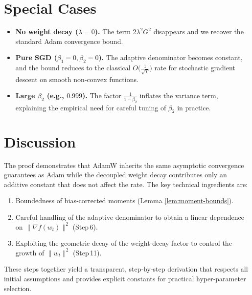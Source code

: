\documentclass{article}
\begin{document}
\section*{Special Cases}
\begin{itemize}
    \item \textbf{No weight decay ($\lambda=0$).} The term $2\lambda^{2}G^{2}$ disappears and we recover the standard Adam convergence bound.
    \item \textbf{Pure SGD ($\beta_{1}=0,\beta_{2}=0$).} The adaptive denominator becomes constant, and the bound reduces to the classical $O\!\big(\frac{1}{\sqrt{T}}\big)$ rate for stochastic gradient descent on smooth non‑convex functions.
    \item \textbf{Large $\beta_{2}$ (e.g., $0.999$).} The factor $\frac{1}{1-\beta_{2}}$ inflates the variance term, explaining the empirical need for careful tuning of $\beta_{2}$ in practice.
\end{itemize}

\section*{Discussion}
The proof demonstrates that AdamW inherits the same asymptotic convergence guarantees as Adam while the decoupled weight decay contributes only an additive constant that does not affect the rate.  The key technical ingredients are:
\begin{enumerate}
    \item Boundedness of bias‑corrected moments (Lemma \ref{lem:moment-bounds}).
    \item Careful handling of the adaptive denominator to obtain a linear dependence on $\|\nabla f(w_{t})\|^{2}$ (Step 6).
    \item Exploiting the geometric decay of the weight‑decay factor to control the growth of $\|w_{t}\|^{2}$ (Step 11).
\end{enumerate}
These steps together yield a transparent, step‑by‑step derivation that respects all initial assumptions and provides explicit constants for practical hyper‑parameter selection.
\end{document}
